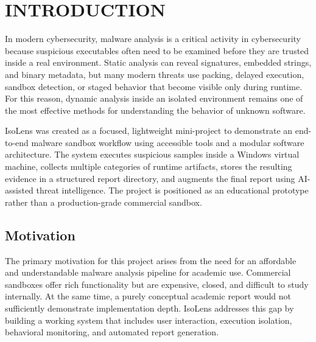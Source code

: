\documentclass[a4paper,12pt,oneside]{report}
\newcommand{\changefont}{%
\fontsize{10}{12}\selectfont
}
\begin{document}
\newpage


\newpage
\renewcommand\thepage{\arabic{page}}
\clearpage
\setlength{\headheight}{15pt}
\pagestyle{fancy}
\fancyhf{}
\lhead{\changefont\thechapter.\leftmark}
\rhead{}
\cfoot{\thepage}
\renewcommand{\chaptermark}[1]{\markboth{#1}{}}
\renewcommand{\sectionmark}[1]{\markright{#1}{}}
\renewcommand{\headrulewidth}{0.5pt}
\setcounter{page}{1}

\chapter{INTRODUCTION}
\noindent
In modern cybersecurity, malware analysis is a critical activity in cybersecurity because suspicious executables often need to be examined before they are trusted inside a real environment. Static analysis can reveal signatures, embedded strings, and binary metadata, but many modern threats use packing, delayed execution, sandbox detection, or staged behavior that become visible only during runtime. For this reason, dynamic analysis inside an isolated environment remains one of the most effective methods for understanding the behavior of unknown software.

\par

\par

IsoLens was created as a focused, lightweight mini-project to demonstrate an end-to-end malware sandbox workflow using accessible tools and a modular software architecture. The system executes suspicious samples inside a Windows virtual machine, collects multiple categories of runtime artifacts, stores the resulting evidence in a structured report directory, and augments the final report using AI-assisted threat intelligence. The project is positioned as an educational prototype rather than a production-grade commercial sandbox.

\section{Motivation}
\noindent
The primary motivation for this project arises from the need for an affordable and understandable malware analysis pipeline for academic use. Commercial sandboxes offer rich functionality but are expensive, closed, and difficult to study internally. At the same time, a purely conceptual academic report would not sufficiently demonstrate implementation depth. IsoLens addresses this gap by building a working system that includes user interaction, execution isolation, behavioral monitoring, and automated report generation.
\end{document}
